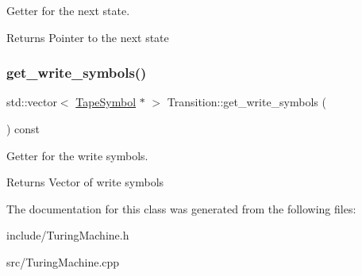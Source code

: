 Getter for the next state. 

\begin{DoxyReturn}{Returns}
Pointer to the next state 
\end{DoxyReturn}
\mbox{\label{classTransition_a313ac6ed2730925df3c79eb2ad0ca2b8}} 
\subsubsection{\texorpdfstring{get\+\_\+write\+\_\+symbols()}{get\_write\_symbols()}}
{\footnotesize\ttfamily std\+::vector$<$ \hyperlink{classTapeSymbol}{Tape\+Symbol} $\ast$ $>$ Transition\+::get\+\_\+write\+\_\+symbols (\begin{DoxyParamCaption}{ }\end{DoxyParamCaption}) const}



Getter for the write symbols. 

\begin{DoxyReturn}{Returns}
Vector of write symbols 
\end{DoxyReturn}


The documentation for this class was generated from the following files\+:\begin{DoxyCompactItemize}
\item 
include/Turing\+Machine.\+h\item 
src/Turing\+Machine.\+cpp\end{DoxyCompactItemize}
